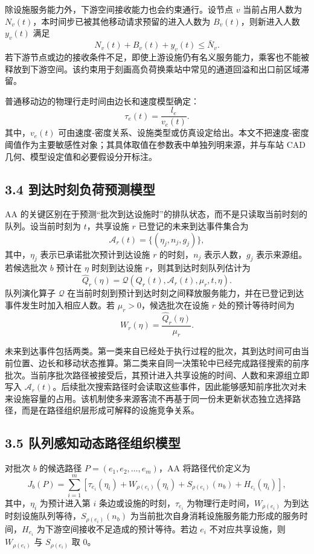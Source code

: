 \documentclass[UTF8,a4paper,12pt]{ctexart}
\begin{document}
除设施服务能力外，下游空间接收能力也会约束通行。设节点 \(v\) 当前占用人数为 \(N_v(t)\)，本时间步已被其他移动请求预留的进入人数为 \(B_v(t)\)，则新进入人数 \(y_v(t)\) 满足
\[
N_v(t)+B_v(t)+y_v(t)\leq \bar N_v .
\]
若下游节点或边的接收条件不足，即使上游设施仍有名义服务能力，乘客也不能被释放到下游空间。该约束用于刻画高负荷换乘站中常见的通道回溢和出口前区域滞留。

普通移动边的物理行走时间由边长和速度模型确定：
\[
\tau_e(t)=\frac{l_e}{v_e(t)}.
\]
其中，\(v_e(t)\) 可由速度-密度关系、设施类型或仿真设定给出。本文不把速度-密度阈值作为主要敏感性对象；其具体取值在参数表中单独列明来源，并与车站 CAD 几何、模型设定值和必要假设分开标注。

\subsection{3.4 到达时刻负荷预测模型}

AA 的关键区别在于预测“批次到达设施时”的排队状态，而不是只读取当前时刻的队列。设当前时刻为 \(t\)，共享设施 \(r\) 已登记的未来到达事件集合为
\[
\mathcal{A}_r(t)=\{(\eta_j,n_j,g_j)\},
\]
其中，\(\eta_j\) 表示已承诺批次预计到达设施 \(r\) 的时刻，\(n_j\) 表示人数，\(g_j\) 表示来源组。若候选批次 \(b\) 预计在 \(\eta\) 时刻到达设施 \(r\)，则其到达时刻队列估计为
\[
\widehat Q_r(\eta)=\mathcal{Q}\left(Q_r(t),\mathcal{A}_r(t),\mu_r,t,\eta\right).
\]
队列演化算子 \(\mathcal{Q}\) 在当前时刻到预计到达时刻之间释放服务能力，并在已登记到达事件发生时加入相应人数。若 \(\mu_r>0\)，候选批次在设施 \(r\) 处的预计等待时间为
\[
W_r(\eta)=\frac{\widehat Q_r(\eta)}{\mu_r}.
\]

未来到达事件包括两类。第一类来自已经处于执行过程的批次，其到达时间可由当前位置、边长和移动状态推算。第二类来自同一决策轮中已经完成路径搜索的前序批次。当前序批次路径被接受后，其预计进入共享设施的时间、人数和来源组立即写入 \(\mathcal{A}_r(t)\)。后续批次搜索路径时会读取这些事件，因此能够感知前序批次对未来设施容量的占用。该机制使多来源客流不再基于同一份未更新状态独立选择路径，而是在路径组织层形成可解释的设施竞争关系。

\subsection{3.5 队列感知动态路径组织模型}

对批次 \(b\) 的候选路径 \(P=(e_1,e_2,\ldots,e_m)\)，AA 将路径代价定义为
\[
J_b(P)=\sum_{i=1}^{m}\left[\tau_{e_i}(\eta_i)+W_{\rho(e_i)}(\eta_i)+S_{\rho(e_i)}(n_b)+H_{e_i}(\eta_i)\right],
\]
其中，\(\eta_i\) 为预计进入第 \(i\) 条边或设施的时刻，\(\tau_{e_i}\) 为物理行走时间，\(W_{\rho(e_i)}\) 为到达时刻设施队列等待，\(S_{\rho(e_i)}(n_b)\) 为当前批次自身消耗设施服务能力形成的服务时间，\(H_{e_i}\) 为下游空间接收不足造成的预计等待。若边 \(e_i\) 不对应共享设施，则 \(W_{\rho(e_i)}\) 与 \(S_{\rho(e_i)}\) 取 0。
\end{document}
